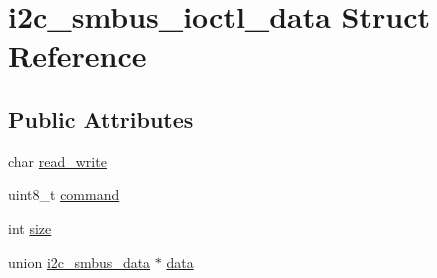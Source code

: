 \hypertarget{structi2c__smbus__ioctl__data}{\section{i2c\-\_\-smbus\-\_\-ioctl\-\_\-data Struct Reference}
\label{structi2c__smbus__ioctl__data}
}
\subsection*{Public Attributes}
\begin{DoxyCompactItemize}
\item 
char \hyperlink{structi2c__smbus__ioctl__data_add449c765b690f883e5771132d16a4f8}{read\-\_\-write}
\item 
uint8\-\_\-t \hyperlink{structi2c__smbus__ioctl__data_adaacbd70d47e01e8bca1457b721089e7}{command}
\item 
int \hyperlink{structi2c__smbus__ioctl__data_a777bacfabf66ba077b40d1c835c7879f}{size}
\item 
union \hyperlink{unioni2c__smbus__data}{i2c\-\_\-smbus\-\_\-data} $\ast$ \hyperlink{structi2c__smbus__ioctl__data_af5a53e4ed38f278bd5fb62a65b67432d}{data}
\end{DoxyCompactItemize}


